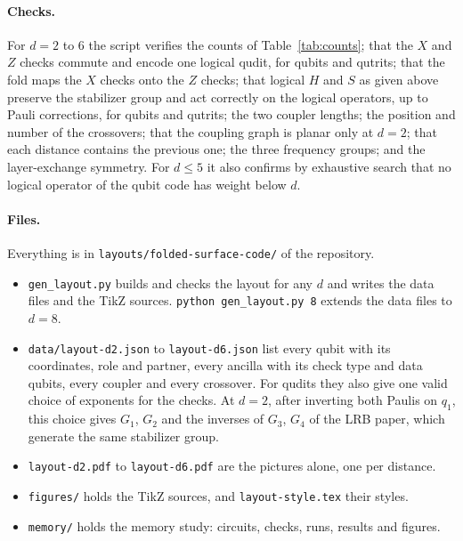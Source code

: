 \documentclass[11pt,a4paper]{article}
\begin{document}
\paragraph{Checks.} For $d=2$ to $6$ the script verifies the counts of Table~\ref{tab:counts};
that the $X$ and $Z$ checks commute and encode one logical qudit, for qubits and qutrits; that
the fold maps the $X$ checks onto the $Z$ checks; that logical $H$ and $S$ as given above
preserve the stabilizer group and act correctly on the logical operators, up to Pauli
corrections, for qubits and qutrits; the two coupler lengths; the position and number of the
crossovers; that the coupling graph is planar only at $d=2$; that each distance contains the
previous one; the three frequency groups; and the layer-exchange symmetry. For $d\le5$ it also confirms by exhaustive search that no logical operator of the
qubit code has weight below $d$.

\paragraph{Files.} Everything is in \texttt{layouts/folded-surface-code/} of the repository.
\begin{itemize}
\item \texttt{gen\_layout.py} builds and checks the layout for any $d$ and writes the data files
and the TikZ sources. \texttt{python gen\_layout.py 8} extends the data files to $d=8$.
\item \texttt{data/layout-d2.json} to \texttt{layout-d6.json} list every qubit with its
coordinates, role and partner, every ancilla with its check type and data qubits, every coupler
and every crossover. For qudits they also give one valid choice of exponents for the checks. At
$d=2$, after inverting both Paulis on $q_1$, this choice gives $G_1$, $G_2$ and the inverses of
$G_3$, $G_4$ of the LRB paper, which generate the same stabilizer group.
\item \texttt{layout-d2.pdf} to \texttt{layout-d6.pdf} are the pictures alone, one per distance.
\item \texttt{figures/} holds the TikZ sources, and \texttt{layout-style.tex} their styles.
\item \texttt{memory/} holds the memory study: circuits, checks, runs, results and figures.
\end{itemize}
\end{document}
